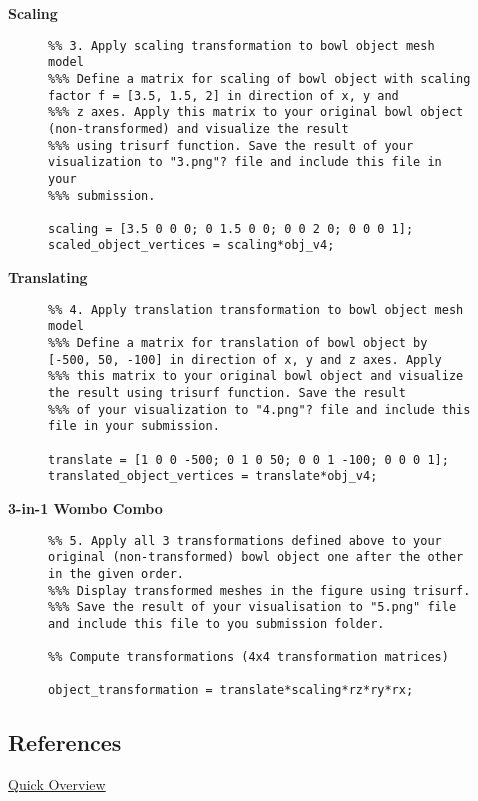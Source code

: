 \textbf{Scaling}
\begin{figure}[!hbt]
	\begin{lstlisting}
%% 3. Apply scaling transformation to bowl object mesh model
%%% Define a matrix for scaling of bowl object with scaling factor f = [3.5, 1.5, 2] in direction of x, y and
%%% z axes. Apply this matrix to your original bowl object (non-transformed) and visualize the result
%%% using trisurf function. Save the result of your visualization to "3.png"? file and include this file in your
%%% submission.

scaling = [3.5 0 0 0; 0 1.5 0 0; 0 0 2 0; 0 0 0 1];
scaled_object_vertices = scaling*obj_v4;
	\end{lstlisting}	
\end{figure}
\newpage
\textbf{Translating}
\begin{figure}[!hbt]
	\begin{lstlisting}
%% 4. Apply translation transformation to bowl object mesh model
%%% Define a matrix for translation of bowl object by [-500, 50, -100] in direction of x, y and z axes. Apply
%%% this matrix to your original bowl object and visualize the result using trisurf function. Save the result
%%% of your visualization to "4.png"? file and include this file in your submission.

translate = [1 0 0 -500; 0 1 0 50; 0 0 1 -100; 0 0 0 1];
translated_object_vertices = translate*obj_v4;
	\end{lstlisting}	
\end{figure}

\textbf{3-in-1 Wombo Combo}
\begin{figure}[!hbt]
	\begin{lstlisting}
%% 5. Apply all 3 transformations defined above to your original (non-transformed) bowl object one after the other in the given order.
%%% Display transformed meshes in the figure using trisurf.
%%% Save the result of your visualisation to "5.png" file and include this file to you submission folder. 

%% Compute transformations (4x4 transformation matrices)

object_transformation = translate*scaling*rz*ry*rx;
	\end{lstlisting}	
\end{figure}
\subsection{References}
\href{http://math.hws.edu/graphicsbook/c2/s3.html}{Quick Overview}

